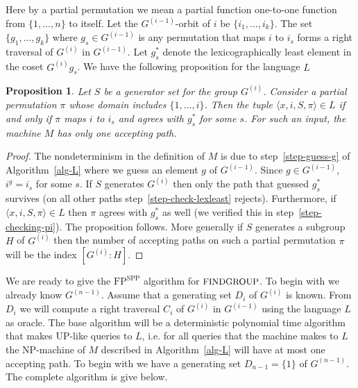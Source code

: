\documentclass[11pt]{madras}%
\newtheorem{proposition}[theorem]{Proposition}
\theoremstyle{remark}
\newcommand{\ProblemFont}[1]{{\ensuremath{\textrm{\small #1}}}}
\begin{document}
Here by a partial permutation we mean a partial function one-to-one
function {from} $\{1,\ldots,n\}$ to itself. Let the $G^{(i-1)}$-orbit
of $i$ be $\{ i_1,\ldots,i_k \}$.  The set $\{ g_1,\ldots,g_k \}$
where $g_s \in G^{(i-1)}$ is any permutation that maps $i$ to $i_s$
forms a right traversal of $G^{(i)}$ in $G^{(i-1)}$.  Let $g_s^*$
denote the lexicographically least element in the coset $G^{(i)}g_s$.
We have the following proposition for the language $L$

\begin{proposition}\label{prop-property-M}
  Let $S$ be a generator set for the group $G^{(i)}$. Consider a
  partial permutation $\pi$ whose domain includes $\{ 1,\ldots,i\}$.
  Then the tuple $\langle x,i,S,\pi\rangle \in L$ if and only if $\pi$
  maps $i$ to $i_s$ and agrees with $g_s^*$ for some $s$.  For such an
  input, the machine $M$ has only one accepting path.
\end{proposition}  
\begin{proof}
  The nondeterminism in the definition of $M$ is due to
  step~\ref{step-guess-g} of Algorithm~\ref{alg-L} where we guess an
  element $g$ of $G^{(i-1)}$. Since $g \in G^{(i-1)}$, $i^g = i_s$ for
  some $s$. If $S$ generates $G^{(i)}$ then only the path that guessed
  $g_s^*$ survives (on all other paths step~\ref{step-check-lexleast}
  rejects). Furthermore, if $\langle x,i,S,\pi\rangle \in L$ then
  $\pi$ agrees with $g_s^*$ as well (we verified this in
  step~\ref{step-checking-pi}). The proposition follows. More
  generally if $S$ generates a subgroup $H$ of $G^{(i)}$ then the
  number of accepting paths on such a partial permutation $\pi$ will
  be the index $[G^{(i)}: H]$.
\end{proof}

We are ready to give the $\mathrm{FP}^{\mathrm{SPP}}$ algorithm for
$\ProblemFont{FINDGROUP}$. To begin with we already know $G^{(n-1)}$.
Assume that a generating set $D_i$ of $G^{(i)}$ is known. {From} $D_i$
we will compute a right traversal $C_i$ of $G^{(i)}$ in $G^{(i-1)}$
using the language $L$ as oracle. The base algorithm will be a
deterministic polynomial time algorithm that makes $\mathrm{UP}$-like
queries to $L$, i.e. for all queries that the machine makes to $L$ the
$\mathrm{NP}$-machine of $M$ described in Algorithm~\ref{alg-L} will
have at most one accepting path.  To begin with we have a generating
set $D_{n-1} = \{ 1 \}$ of $G^{(n-1)}$. The complete algorithm is give
below.
\end{document}
